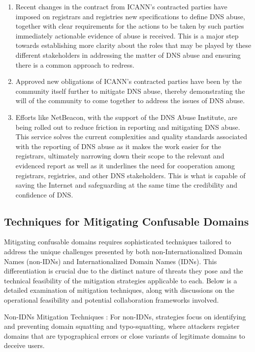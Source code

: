 \begin{enumerate}
  \item Recent changes in the contract from ICANN's contracted parties have imposed on registrars and registries new specifications to define DNS abuse, together with clear requirements for the actions to be taken by such parties immediately actionable evidence of abuse is received. This is a major step towards establishing more clarity about the roles that may be played by these different stakeholders in addressing the matter of DNS abuse and ensuring there is a common approach to redress. \cite{Weinstein2023}
  \item Approved new obligations of ICANN's contracted parties have been by the community itself further to mitigate DNS abuse, thereby demonstrating the will of the community to come together to address the issues of DNS abuse. \cite{ICANN2023}
  \item Efforts like NetBeacon, with the support of the DNS Abuse Institute, are being rolled out to reduce friction in reporting and mitigating DNS abuse. This service solves the current complexities and quality standards associated with the reporting of DNS abuse as it makes the work easier for the registrars, ultimately narrowing down their scope to the relevant and evidenced report as well as it underlines the need for cooperation among registrars, registries, and other DNS stakeholders. This is what is capable of saving the Internet and safeguarding at the same time the credibility and confidence of DNS. \cite{NetBeacon}
  
\end{enumerate}

\subsection{Techniques for Mitigating Confusable Domains}

Mitigating confusable domains requires sophisticated techniques tailored to address the unique challenges presented by both non-Internationalized Domain Names (non-IDNs) and Internationalized Domain Names (IDNs). This differentiation is crucial due to the distinct nature of threats they pose and the technical feasibility of the mitigation strategies applicable to each. Below is a detailed examination of mitigation techniques, along with discussions on the operational feasibility and potential collaboration frameworks involved.

Non-IDNs Mitigation Techniques : For non-IDNs, strategies focus on identifying and preventing domain squatting and typo-squatting, where attackers register domains that are typographical errors or close variants of legitimate domains to deceive users.

